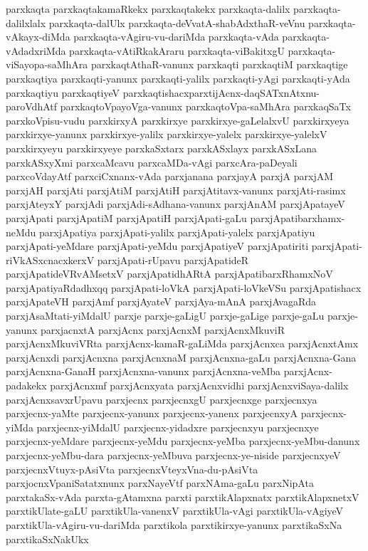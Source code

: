 {parxkaqta
parxkaqtakamaRkekx
parxkaqtakekx
parxkaqta-dalilx
parxkaqta-dalilxlalx
parxkaqta-dalUlx
parxkaqta-deVvatA-shabAdxthaR-veVnu
parxkaqta-vAkayx-diMda
parxkaqta-vAgiru-vu-dariMda
parxkaqta-vAda
parxkaqta-vAdadxriMda
parxkaqta-vAtiRkakAraru
parxkaqta-viBakitxgU
parxkaqta-viSayopa-saMhAra
parxkaqtAthaR-vanunx
parxkaqti
parxkaqtiM
parxkaqtige
parxkaqtiya
parxkaqti-yanunx
parxkaqti-yalilx
parxkaqti-yAgi
parxkaqti-yAda
parxkaqtiyu
parxkaqtiyeV
parxkaqtishacxparxtijAcnx-daqSATxnAtxnu-paroVdhAtf
parxkaqtoVpayoVga-vanunx
parxkaqtoVpa-saMhAra
parxkaqSaTx
parxkoVpisu-vudu
parxkirxyA
parxkirxye
parxkirxye-gaLelalxvU
parxkirxyeya
parxkirxye-yanunx
parxkirxye-yalilx
parxkirxye-yalelx
parxkirxye-yalelxV
parxkirxyeyu
parxkirxyeye
parxkaSxtarx
parxkASxlayx
parxkASxLana
parxkASxyXmi
parxcaMcavu
parxcaMDa-vAgi
parxcAra-paDeyali
parxcoVdayAtf
parxciCxnanx-vAda
parxjanana
parxjayA
parxjA
parxjAM
parxjAH
parxjAti
parxjAtiM
parxjAtiH
parxjAtitavx-vanunx
parxjAti-rasimx
parxjAteyxY
parxjAdi
parxjAdi-sAdhana-vanunx
parxjAnAM
parxjApatayeV
parxjApati
parxjApatiM
parxjApatiH
parxjApati-gaLu
parxjApatibarxhamx-neMdu
parxjApatiya
parxjApati-yalilx
parxjApati-yalelx
parxjApatiyu
parxjApati-yeMdare
parxjApati-yeMdu
parxjApatiyeV
parxjApatiriti
parxjApati-riVkASxcnacxkerxV
parxjApati-rUpavu
parxjApatideR
parxjApatideVRvAMsetxV
parxjApatidhARtA
parxjApatibarxRhamxNoV
parxjApatiyaRdadhxqq
parxjApati-loVkA
parxjApati-loVkeVSu
parxjApatishacx
parxjApateVH
parxjAmf
parxjAyateV
parxjAya-mAnA
parxjAvagaRda
parxjAsaMtati-yiMdalU
parxje
parxje-gaLigU
parxje-gaLige
parxje-gaLu
parxje-yanunx
parxjacnxtA
parxjAcnx
parxjAcnxM
parxjAcnxMkuviR
parxjAcnxMkuviVRta
parxjAcnx-kamaR-gaLiMda
parxjAcnxca
parxjAcnxtAmx
parxjAcnxdi
parxjAcnxna
parxjAcnxnaM
parxjAcnxna-gaLu
parxjAcnxna-Gana
parxjAcnxna-GanaH
parxjAcnxna-vanunx
parxjAcnxna-veMba
parxjAcnx-padakekx
parxjAcnxmf
parxjAcnxyata
parxjAcnxvidhi
parxjAcnxviSaya-dalilx
parxjAcnxsavxrUpavu
parxjecnx
parxjecnxgU
parxjecnxge
parxjecnxya
parxjecnx-yaMte
parxjecnx-yanunx
parxjecnx-yanenx
parxjecnxyA
parxjecnx-yiMda
parxjecnx-yiMdalU
parxjecnx-yidadxre
parxjecnxyu
parxjecnxye
parxjecnx-yeMdare
parxjecnx-yeMdu
parxjecnx-yeMba
parxjecnx-yeMbu-danunx
parxjecnx-yeMbu-dara
parxjecnx-yeMbuva
parxjecnx-ye-niside
parxjecnxyeV
parxjecnxVtuyx-pAsiVta
parxjecnxVteyxVna-du-pAsiVta
parxjocnxVpaniSatatxnunx
parxNayeVtf
parxNAma-gaLu
parxNipAta
parxtakaSx-vAda
parxta-gAtamxna
parxti
parxtikAlapxnatx
parxtikAlapxnetxV
parxtikUlate-gaLU
parxtikUla-vanenxV
parxtikUla-vAgi
parxtikUla-vAgiyeV
parxtikUla-vAgiru-vu-dariMda
parxtikola
parxtikirxye-yanunx
parxtikaSxNa
parxtikaSxNakUkx
}
